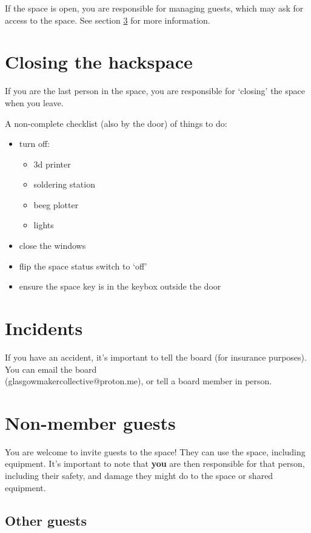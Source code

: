 \documentclass[a5paper,pagesize,10pt,bibtotoc,pointlessnumbers,
normalheadings,DIV=9,twoside=false]{scrbook}
\begin{document}
If the space is open, you are responsible for managing guests, which may ask for access to the space. See section \ref{guests} for more information.

\section{Closing the hackspace}

If you are the last person in the space, you are responsible for `closing' the space when you leave. 

A non-complete checklist (also by the door) of things to do:
\begin{itemize}
    \item turn off:
    \begin{itemize}
        \item 3d printer
        \item soldering station
        \item beeg plotter
        \item lights
    \end{itemize}
    \item close the windows
    \item flip the space status switch to `off'
    \item ensure the space key is in the keybox outside the door
\end{itemize}

\section{Incidents}

If you have an accident, it's important to tell the board (for insurance purposes).
You can email the board 
\\(glasgowmakercollective@proton.me), 
or tell a board member in person.

\section{Non-member guests} \label{guests}

You are welcome to invite guests to the space!
They can use the space, including equipment.
It's important to note that \textbf{you} are then responsible for that person, including their safety, and damage they might do to the space or shared equipment.

\subsection{Other guests}
\end{document}
